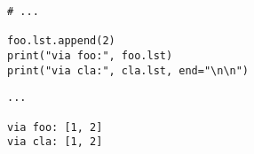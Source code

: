 
\begin{frame}[fragile]
%
\begin{tcbraster}[raster columns=2,
                  raster equal height,
                  nobeforeafter,
                  raster column skip=0.5cm]
\begin{codebox}
\begin{verbatim}
# ...

foo.lst.append(2)
print("via foo:", foo.lst)
print("via cla:", cla.lst, end="\n\n")
\end{verbatim}
\end{codebox}
%
\begin{cmdbox}
\begin{verbatim}
...

via foo: [1, 2]
via cla: [1, 2]
\end{verbatim}
\end{cmdbox}
\end{tcbraster}
%
\end{frame}


